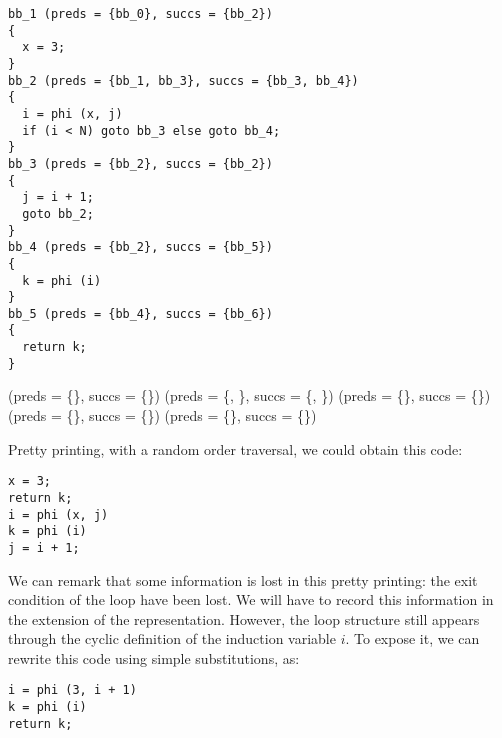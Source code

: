 {\begin{center}
  \begin{minipage}{.8\linewidth}
\begin{verbatim}
bb_1 (preds = {bb_0}, succs = {bb_2})
{
  x = 3;
}
bb_2 (preds = {bb_1, bb_3}, succs = {bb_3, bb_4})
{
  i = phi (x, j)
  if (i < N) goto bb_3 else goto bb_4;
}
bb_3 (preds = {bb_2}, succs = {bb_2})
{
  j = i + 1;
  goto bb_2;
}
bb_4 (preds = {bb_2}, succs = {bb_5})
{
  k = phi (i)
}
bb_5 (preds = {bb_4}, succs = {bb_6})
{
  return k;
}
\end{verbatim}
\end{minipage}
\end{center}
\begin{algorithm}
   (preds = \{\}, succs = \{\})\;
   (preds = \{, \}, succs = \{, \})\;
   (preds = \{\}, succs = \{\})\;
   (preds = \{\}, succs = \{\})\;
   (preds = \{\}, succs = \{\})\;

\end{algorithm}

\noindent
Pretty printing, with a random order traversal, we could obtain this
\SSA{} code:
\begin{center}
  \begin{minipage}{.8\linewidth}
\begin{verbatim}
x = 3;
return k;
i = phi (x, j)
k = phi (i)
j = i + 1;
\end{verbatim}
\end{minipage}
\end{center}

We can remark that some information is lost in this pretty printing:
the exit condition of the loop have been lost. We will have to record
this information in the extension of the \SSA{} representation. However, the
loop structure still appears through the cyclic definition of the induction variable $i$. To expose it, we can rewrite this
\SSA{} code using simple substitutions, as:

\begin{center}
  \begin{minipage}{.8\linewidth}
\begin{verbatim}
i = phi (3, i + 1)
k = phi (i)
return k;
\end{verbatim}
\end{minipage}
\end{center}

}
